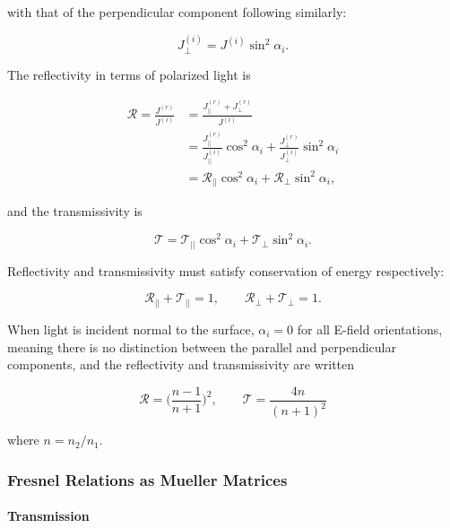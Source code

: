 with that of the perpendicular component following similarly:

\begin{equation}
    J_{\perp}^{(i)} = J^{(i)} \sin^2{\alpha_i}.
\end{equation}

The reflectivity in terms of polarized light is

\begin{align}
    \mathcal{R} = \frac{J^{(r)}}{J^{(i)}} &= \frac{J_{||}^{(r)} + J_{\perp}^{(r)}}{J^{(i)}} \nonumber \\
    &= \frac{J_{||}^{(r)}}{J_{||}^{(i)}} \cos^2{\alpha_i} + \frac{J_{\perp}^{(r)}}{J_{\perp}^{(i)}} \sin^2{\alpha_i} \nonumber \\
    &= \mathcal{R}_{||} \cos^2{\alpha_i} + \mathcal{R}_{\perp} \sin^2{\alpha_i},
\end{align}

and the transmissivity is

\begin{equation}
    \mathcal{T} = \mathcal{T}_{||} \cos^2{\alpha_i} + \mathcal{T}_{\perp} \sin^2{\alpha_i}.
\end{equation}

Reflectivity and transmissivity must satisfy conservation of energy respectively:

\begin{equation}
    \mathcal{R}_{||} + \mathcal{T}_{||} = 1, \qquad \mathcal{R}_{\perp} + \mathcal{T}_{\perp} = 1.
\end{equation}

When light is incident normal to the surface, $\alpha_i = 0$ for all E-field orientations, meaning there is no distinction between the parallel and perpendicular components, and the reflectivity and transmissivity are written

\begin{equation}
    \mathcal{R} = \bigg(\frac{n - 1}{n+1} \bigg)^2, \qquad \mathcal{T} = \frac{4n}{(n + 1)^2}
\end{equation}

where $n = n_2 / n_1$.

\subsubsection{Fresnel Relations as Mueller Matrices}
\paragraph{Transmission}


